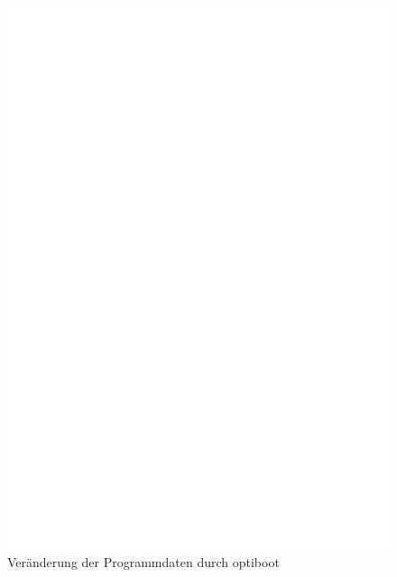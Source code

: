 \begin{figure}[H]
\centering
\includegraphics[]{../FIG/VectorMove.eps}
\caption{Veränderung der Programmdaten durch optiboot}
\label{fig:VectorMove}
\end{figure}

